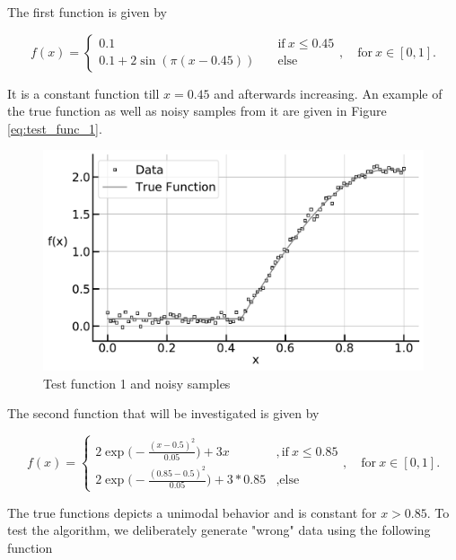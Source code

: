 \documentclass[10pt,a4paper]{article}
\begin{document}
The first function is given by

\begin{equation} \label{eq:test_func_1}
	f(x) = \begin{cases}
			 0.1 \quad &\text{if} \ x \le 0.45 \\ 
			 0.1 + 2\sin (\pi(x-0.45)) \quad &\text{else}  
		  \end{cases}, \quad \text{for} \ x \in [0, 1].
\end{equation}
	
It is a constant function till $x=0.45$ and afterwards increasing. An example of the true function as well as noisy samples from it are given in Figure \ref{eq:test_func_1}.

\begin{figure}[H]
	\centering
	\includegraphics[width=\columnwidth]{../thesisplots/exp_inc1_data.pdf}
	\caption{Test function 1 and noisy samples}
	\label{fig:test_func_1}
\end{figure}

The second function that will be investigated is given by

\begin{equation} \label{eq:test_func_2}
	f(x) = \begin{cases}
					2\exp \big(-\frac{(x-0.5)^2}{0.05} \big) + 3x  &,\text{if} \ x \le 0.85 \\
					2\exp \big(-\frac{(0.85-0.5)^2}{0.05} \big) + 3*0.85  &,\text{else}
	       \end{cases}, \quad \text{for} \ x \in [0,1]. 	
\end{equation}

The true functions depicts a unimodal behavior and is constant for $x > 0.85$. To test the algorithm, we deliberately generate "wrong" data using the following function
\end{document}
